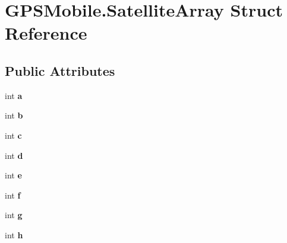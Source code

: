 \hypertarget{struct_g_p_s_mobile_1_1_satellite_array}{
\section{GPSMobile.SatelliteArray Struct Reference}
\label{struct_g_p_s_mobile_1_1_satellite_array}
}
\subsection*{Public Attributes}
\begin{DoxyCompactItemize}
\item 
\hypertarget{struct_g_p_s_mobile_1_1_satellite_array_a6d9b0c954df46d3478c3a014295ade3f}{
int {\bfseries a}}
\label{struct_g_p_s_mobile_1_1_satellite_array_a6d9b0c954df46d3478c3a014295ade3f}

\item 
\hypertarget{struct_g_p_s_mobile_1_1_satellite_array_a5cde85685ec9ed6f719b8bc6aef68825}{
int {\bfseries b}}
\label{struct_g_p_s_mobile_1_1_satellite_array_a5cde85685ec9ed6f719b8bc6aef68825}

\item 
\hypertarget{struct_g_p_s_mobile_1_1_satellite_array_a8d9a5a5f34ba7e68d13229cd1abf3161}{
int {\bfseries c}}
\label{struct_g_p_s_mobile_1_1_satellite_array_a8d9a5a5f34ba7e68d13229cd1abf3161}

\item 
\hypertarget{struct_g_p_s_mobile_1_1_satellite_array_ad5f85990652fe7e4e30397ed4b771d13}{
int {\bfseries d}}
\label{struct_g_p_s_mobile_1_1_satellite_array_ad5f85990652fe7e4e30397ed4b771d13}

\item 
\hypertarget{struct_g_p_s_mobile_1_1_satellite_array_a02fdc9acafeb90c0ad579b5250fa96a0}{
int {\bfseries e}}
\label{struct_g_p_s_mobile_1_1_satellite_array_a02fdc9acafeb90c0ad579b5250fa96a0}

\item 
\hypertarget{struct_g_p_s_mobile_1_1_satellite_array_a45f767bf59869179fb9d19b63cf3a7d5}{
int {\bfseries f}}
\label{struct_g_p_s_mobile_1_1_satellite_array_a45f767bf59869179fb9d19b63cf3a7d5}

\item 
\hypertarget{struct_g_p_s_mobile_1_1_satellite_array_adbdecc584cfec8c663b81000d4a3df30}{
int {\bfseries g}}
\label{struct_g_p_s_mobile_1_1_satellite_array_adbdecc584cfec8c663b81000d4a3df30}

\item 
\hypertarget{struct_g_p_s_mobile_1_1_satellite_array_abf2e6b985e5d6b2caba4d715d9070bc3}{
int {\bfseries h}}
\label{struct_g_p_s_mobile_1_1_satellite_array_abf2e6b985e5d6b2caba4d715d9070bc3}


\end{DoxyCompactItemize}

